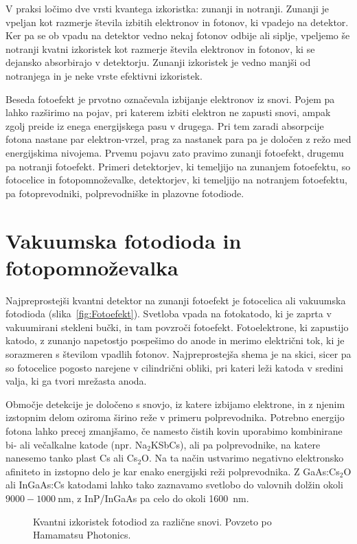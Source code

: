 \begin{remark}
V praksi ločimo dve vrsti kvantega izkoristka: zunanji in notranji. Zunanji je vpeljan kot 
razmerje števila izbitih elektronov in fotonov, ki vpadejo na detektor. Ker pa se 
ob vpadu na detektor vedno nekaj fotonov odbije ali siplje, vpeljemo še notranji kvatni 
izkoristek kot razmerje števila elektronov in fotonov, ki se dejansko absorbirajo v detektorju.
Zunanji izkoristek je vedno manjši od notranjega in je neke vrste efektivni izkoristek.
\end{remark}

Beseda fotoefekt je prvotno označevala izbijanje elektronov iz snovi. 
Pojem pa lahko razširimo na pojav, pri katerem izbiti elektron ne zapusti snovi, 
ampak zgolj preide iz enega energijskega pasu v drugega. Pri tem zaradi
absorpcije fotona nastane par elektron-vrzel, prag za nastanek para pa je določen
z režo med energijskima nivojema. Prvemu pojavu zato pravimo zunanji fotoefekt, 
drugemu pa notranji fotoefekt. Primeri detektorjev, ki temeljijo na zunanjem fotoefektu, so 
fotocelice in fotopomnoževalke, detektorjev, ki temeljijo na notranjem fotoefektu, pa
fotoprevodniki, polprevodniške in plazovne fotodiode.

\section{Vakuumska fotodioda in fotopomnoževalka}

Najpreprostejši kvantni detektor na zunanji fotoefekt je fotocelica ali vakuumska fotodioda
(slika~\ref{fig:Fotoefekt}). 
Svetloba vpada na fotokatodo, ki je zaprta v vakuumirani stekleni bučki, in tam povzroči
fotoefekt. Fotoelektrone, ki zapustijo katodo, z zunanjo napetostjo pospešimo do anode 
in merimo električni tok, ki je sorazmeren s številom vpadlih fotonov. Najpreprostejša
shema je na skici, sicer pa so fotocelice pogosto narejene v cilindrični obliki, pri kateri leži
katoda v sredini valja, ki ga tvori mrežasta anoda.

Območje detekcije je določeno s snovjo, iz katere izbijamo elektrone, in z njenim izstopnim delom
oziroma širino reže v primeru polprevodnika.
Potrebno energijo fotona lahko precej zmanjšamo, 
če namesto čistih kovin uporabimo kombinirane bi- ali večalkalne katode (npr. Na$_2$KSbCs),
ali pa polprevodnike, na katere nanesemo tanko plast Cs ali Cs$_2$O. Na ta način ustvarimo 
negativno elektronsko afiniteto in izstopno delo je kar enako energijski
reži polprevodnika. Z GaAs:Cs$_2$O ali InGaAs:Cs 
katodami lahko tako zaznavamo svetlobo do valovnih dolžin okoli $9000-1000~\si{\nano\metre}$,
z InP/InGaAs pa celo do okoli 1600~nm. 
\begin{figure}[h]
\centering
\def\svgwidth{110truemm} 

\caption{Kvantni izkoristek fotodiod za različne snovi. Povzeto po Hamamatsu Photonics.}
\label{fig:Fotodioda}
\end{figure}

